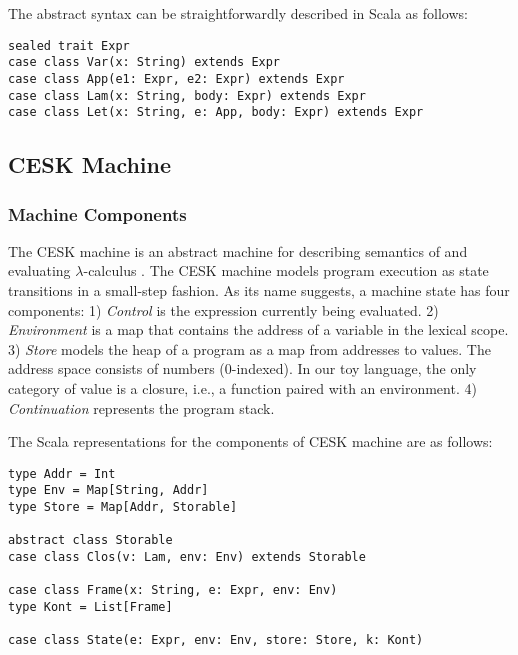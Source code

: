 \documentclass[acmsmall,review,anonymous]{acmart}\settopmatter{printfolios=true,printccs=false,printacmref=false}
\begin{document}
The abstract syntax can be straightforwardly described in Scala as follows:

\begin{lstlisting}
sealed trait Expr
case class Var(x: String) extends Expr
case class App(e1: Expr, e2: Expr) extends Expr
case class Lam(x: String, body: Expr) extends Expr
case class Let(x: String, e: App, body: Expr) extends Expr
\end{lstlisting}

\subsection{CESK Machine} \label{cesk}

\subsubsection{Machine Components}

The CESK machine is an
abstract machine for describing semantics of and evaluating $\lambda$-calculus \cite{felleisen1987calculus}.
The CESK machine models program execution as state transitions in a small-step fashion.
As its name suggests, a machine state has four components:
1) \textit{Control} is the expression currently being evaluated.
2) \textit{Environment} is a map that contains the address of a variable in the lexical scope.
3) \textit{Store} models the heap of a program as a map from addresses to values.
The address space consists of numbers (0-indexed).
In our toy language, the only category of value is a closure, i.e., a function paired with an environment.
4) \textit{Continuation} represents the program stack. 

The Scala representations for the components of CESK machine are as follows:

\begin{lstlisting}
type Addr = Int
type Env = Map[String, Addr]
type Store = Map[Addr, Storable]

abstract class Storable
case class Clos(v: Lam, env: Env) extends Storable

case class Frame(x: String, e: Expr, env: Env)
type Kont = List[Frame]

case class State(e: Expr, env: Env, store: Store, k: Kont)
\end{lstlisting}
\end{document}

